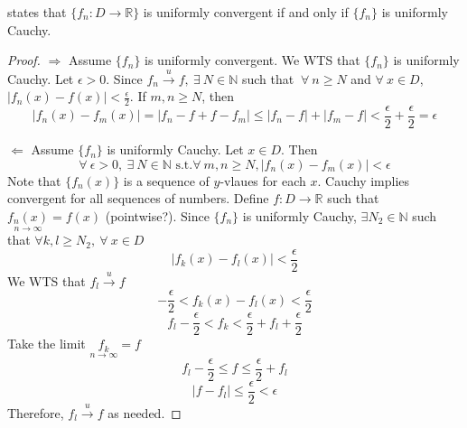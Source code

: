 \documentclass[12pt]{scrartcl}
\begin{document}
\begin{theorem}
   states that 
  $\{f_n: D \to \mathbb{R}\}$ is uniformly convergent if and only if $\{f_n\}$ is uniformly Cauchy.

  \begin{proof}
    
    \hfill

    $\Longrightarrow$ Assume $\{f_n\}$ is uniformly convergent. We WTS that $\{f_n\}$ is uniformly Cauchy. 
    Let $\epsilon > 0$. Since $f_n \overset{u}{\longrightarrow} f, \ \exists \ N \in \mathbb{N}$ such that $\ \forall \ n \geq N$ and $\forall \ x \in D$, 
    $|f_n(x) - f(x)| < \frac{\epsilon}{2}$. If $m, n \geq N$, then 
    \[|f_n(x) - f_m(x)| = |f_n - f + f - f_m| \leq |f_n - f| + |f_m - f| < \frac{\epsilon}{2} + \frac{\epsilon}{2} = \epsilon\]

    $\Longleftarrow$ Assume $\{f_n\}$ is uniformly Cauchy. Let $x \in D$. Then 
    \[\forall \ \epsilon > 0, \ \exists \ N \in \mathbb{N} \text{ s.t.}  \forall \ m, n \geq N, |f_n(x) - f_m(x)| < \epsilon\]
    Note that $\{f_n(x)\}$ is a sequence of $y$-vlaues for each $x$. Cauchy implies convergent for all 
    sequences of numbers. Define $f: D \to \mathbb{R}$ such that $\underset{n\to\infty}{f_n(x)} = f(x)$ (pointwise?). 
    Since $\{f_n\}$ is uniformly Cauchy, $\exists N_2 \in \mathbb{N}$ such that $\forall k, l \geq N_2, \ \forall \ x \in D$
    \[|f_k(x) - f_l(x)| < \frac{\epsilon}{2}\]
    We WTS that $f_l \overset{u}{\longrightarrow} f$
    \[-\frac{\epsilon}{2} < f_k(x) - f_l(x) < \frac{\epsilon}{2}\]
    \[f_l - \frac{\epsilon}{2} < f_k < \frac{\epsilon}{2} + f_l + \frac{\epsilon}{2}\]
    Take the limit $\underset{n\to\infty}{f_k} = f$
    \[f_l - \frac{\epsilon}{2} \leq f \leq \frac{\epsilon}{2} + f_l\]
    \[|f-f_l| \leq \frac{\epsilon}{2} < \epsilon\]
    Therefore, $f_l \overset{u}{\longrightarrow} f$ as needed.
  \end{proof}
\end{theorem}
\end{document}
